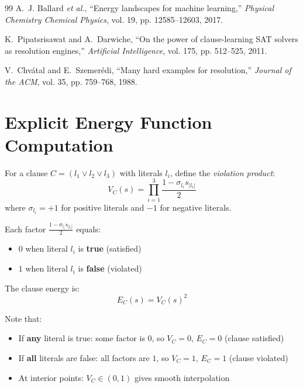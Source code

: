 \documentclass[11pt,a4paper]{article}
\theoremstyle{plain}
\theoremstyle{definition}
\theoremstyle{remark}
\begin{document}
\begin{thebibliography}{99}
A.~J. Ballard \emph{et al.}, ``Energy landscapes for machine learning,'' \emph{Physical Chemistry Chemical Physics}, vol. 19, pp. 12585--12603, 2017.

K.~Pipatsrisawat and A.~Darwiche, ``On the power of clause-learning SAT solvers as resolution engines,'' \emph{Artificial Intelligence}, vol. 175, pp. 512--525, 2011.

V.~Chv\'{a}tal and E.~Szemer\'{e}di, ``Many hard examples for resolution,'' \emph{Journal of the ACM}, vol. 35, pp. 759--768, 1988.

\end{thebibliography}

\appendix

\section{Explicit Energy Function Computation}

For a clause $C = (l_1 \vee l_2 \vee l_3)$ with literals $l_i$, define the \emph{violation product}:
\begin{equation}
    V_C(s) = \prod_{i=1}^{3} \frac{1 - \sigma_{l_i} s_{|l_i|}}{2}
\end{equation}
where $\sigma_{l_i} = +1$ for positive literals and $-1$ for negative literals.

Each factor $\frac{1 - \sigma_{l_i} s_{|l_i|}}{2}$ equals:
\begin{itemize}
    \item $0$ when literal $l_i$ is \textbf{true} (satisfied)
    \item $1$ when literal $l_i$ is \textbf{false} (violated)
\end{itemize}

The clause energy is:
\begin{equation}
    E_C(s) = V_C(s)^2
\end{equation}

Note that:
\begin{itemize}
    \item If \textbf{any} literal is true: some factor is $0$, so $V_C = 0$, $E_C = 0$ (clause satisfied)
    \item If \textbf{all} literals are false: all factors are $1$, so $V_C = 1$, $E_C = 1$ (clause violated)
    \item At interior points: $V_C \in (0,1)$ gives smooth interpolation
\end{itemize}
\end{document}
